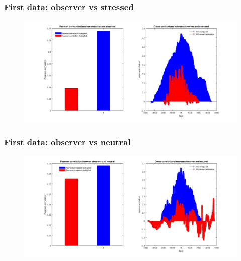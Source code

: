 \documentclass{beamer}
\begin{document}
\begin{frame}
\frametitle{First data: observer vs stressed}





\begin{figure}[H]
	\begin{center}
		\hspace*{-1cm}
		\includegraphics[scale=.30]{obs_vs_stress.jpg} 
	\end{center}  
	
	
\end{figure}


\end{frame}	

\begin{frame}
\frametitle{First data: observer vs neutral}





\begin{figure}[H]
	\begin{center}
		\hspace*{-1cm}
		\includegraphics[scale=.30]{obs_neut.jpg} 
	\end{center}  
	
	
\end{figure}


\end{frame}	
\end{document}

